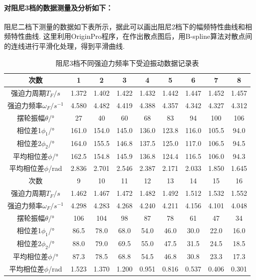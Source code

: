 \documentclass[UTF8]{ctexart}
\begin{document}
\paragraph{对阻尼3档的数据测量及分析如下：}\quad \par
阻尼二档下测量的数据如下表所示，据此可以画出阻尼2档下的幅频特性曲线和相频特性曲线. 这里利用OriginPro程序，在作出散点图后，用B-spline算法对散点间的连线进行平滑化处理，得到平滑曲线.\par
\begin{table}[H]{\begin{center}\caption{阻尼3档不同强迫力频率下受迫振动数据记录表}%
\begin{tabular}[H]{|c|c|c|c|c|c|c|c|c|}
\hline
次数&1&2&3&4&5&6&7&8\\
\hline
强迫力周期$T_F/s$&1.372&1.402&1.422&1.432&1.442&1.447&1.452&1.457\\
\hline
强迫力频率$\omega_F/s^{-1}$&4.580&4.482&4.419&4.388&4.357&4.342&4.327&4.312\\
\hline
摆轮振幅$\theta$/°&27&40&60&68&83&94&100&106\\
\hline
相位差1$\phi_1$/°&161.0&154.0&145.0&136.0&123.8&116.0&105.5&94.0\\
\hline
相位差2$\phi_2$/°&164.0&155.5&146.8&137.5&125.0&117.0&106.5&94.5\\
\hline
平均相位差$\phi$/°&162.5&154.8&145.9&136.8&124.4&116.5&106.0&94.3\\
\hline
平均相位差$\phi$/rad&2.836&2.701&2.546&2.387&2.171&2.033&1.850&1.645\\
\hline
次数&9&10&11&12&13&14&15&16\\
\hline
强迫力周期$T_F/s$&1.462&1.467&1.472&1.482&1.492&1.512&1.532&1.552\\
\hline
强迫力频率$\omega_F/s^{-1}$&4.298&4.283&4.268&4.240&4.211&4.156&4.101&4.048\\
\hline
摆轮振幅$\theta$/°&106&104&98&87&78&61&47&34\\
\hline
相位差1$\phi_1$/°&86.5&78.0&68.0&54.0&46.0&30.0&22.0&16.0\\
\hline
相位差2$\phi_2$/°&88.0&79.0&69.5&55.0&47.5&31.5&24.5&18.5\\
\hline
平均相位差$\phi$/°&87.3&78.5&68.8&54.5&46.8&30.8&23.3&17.3\\
\hline
平均相位差$\phi$/rad&1.523&1.370&1.200&0.951&0.816&0.537&0.406&0.301\\
\hline
\end{tabular}%
\end{center}}\end{table}
\end{document}

